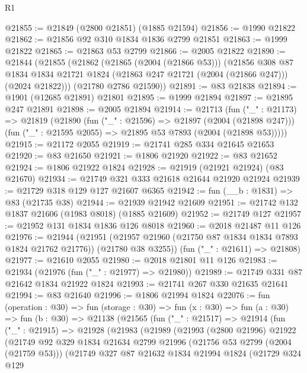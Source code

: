 \begin{lexlean}{R1}
\begin{coremodule}
@21855 := @21849 (@2800 @21851) (@1885 @21594)
@21856 := @1990 @21822
@21862 := @21856 @92 @310 @1834 @1836 @2799 @21851
@21863 := @1999 @21822
@21865 := @21863 @53 @2799
@21866 := @2005 @21822
@21890 := @21844
    (@21855
      (@21862
        (@21865 (@2004 (@21866 @53)))
        (@21856
          @308
          @87
          @1834
          @1834
          @21721
          @1824
          (@21863 @247 @21721 (@2004 (@21866 @247)))
          (@2024 @21822)))
      (@21780 @2786 @21590))
@21891 := @83 @21838
@21894 := @1901 (@12685 @21891) @21801
@21895 := @1999 @21894
@21897 := @21895 @247 @21891
@21898 := @2005 @21894
@21914 := @21713
    (fun ("_" : @21173) =>
    @21819
      (@21890
        (fun ("_" : @21596) => @21897 (@2004 (@21898 @247)))
        (fun ("_" : @21595 @2055) => @21895 @53 @7893 (@2004 (@21898 @53)))))
@21915 := @21172 @2055
@21919 := @21741 @285 @334 @21645 @21653
@21920 := @83 @21650
@21921 := @1806 @21920
@21922 := @83 @21652
@21924 := @1806 @21922 @1824
@21928 := @21919 (@21921 @21924) (@83 @21670)
@21934 := @21749 @321 @333 @21618 @21644 @21920 @21924
@21939 := @21729 @318 @129 @127 @21607 @6365
@21942 := fun (__b : @1831) => @83 (@21735 @38)
@21944 := @21939 @21942 @21609
@21951 := @21742 @132 @1837 @21606 (@1983 @8018) (@1885 @21609)
@21952 := @21749 @127
@21957 := @21952 @131 @1834 @1836 @126 @8018
@21960 := @2018 @21487 @11 @126
@21976 := @21944
    (@21951 (@21957 @21960 (@21750 @87 @1834 @1834 @7893 @1824 @21762 @21776)) (@21780 @38 @3255))
    (fun ("_" : @21611) => @21808)
@21977 := @21610 @2055
@21980 := @2018 @21801 @11 @126
@21983 := @21934 (@21976 (fun ("_" : @21977) => @21980))
@21989 := @21749 @331 @87 @21642 @1834 @21922 @1824
@21993 := @21741 @267 @330 @21635 @21641
@21994 := @83 @21640
@21996 := @1806 @21994 @1824
@22076 := fun (operation : @30) =>
  fun (storage : @30) =>
  fun (x : @30) =>
  fun (a : @30) =>
  fun (b : @30) =>
  @21138
    (@21565
      (fun ("_" : @21517) =>
      @21914
        (fun ("_" : @21915) =>
        @21928
          (@21983
            (@21989
              (@21993
                (@2800 @21996)
                @21922
                (@21749
                  @92
                  @329
                  @1834
                  @21634
                  @2799
                  @21996
                  (@21756 @53 @2799 (@2004 (@21759 @53)))
                  (@21749
                    @327
                    @87
                    @21632
                    @1834
                    @21994
                    @1824
                    (@21729
                      @324
                      @129

\end{coremodule}
\end{lexlean}
